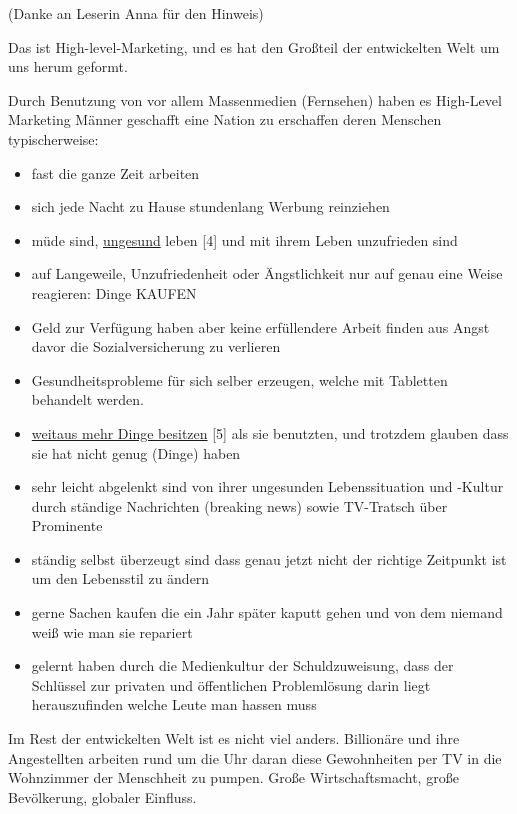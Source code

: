 (Danke an Leserin Anna für den Hinweis)

Das ist High-level-Marketing, und es hat den Großteil der entwickelten Welt um uns herum geformt.

Durch Benutzung von vor allem Massenmedien (Fernsehen) haben es High-Level Marketing Männer geschafft eine Nation zu erschaffen deren Menschen typischerweise:

\begin{itemize}
\item fast die ganze Zeit arbeiten
\item sich jede Nacht zu Hause stundenlang Werbung reinziehen
\item müde sind, \href{http://www.raptitude.com/2010/10/being-healthy-is-not-normal/}{ungesund} leben [4] und mit ihrem Leben unzufrieden sind
\item auf Langeweile, Unzufriedenheit oder Ängstlichkeit nur auf genau eine Weise reagieren: Dinge KAUFEN
\item Geld zur Verfügung haben aber keine erfüllendere Arbeit finden aus Angst davor die Sozialversicherung zu verlieren
\item Gesundheitsprobleme für sich selber erzeugen, welche mit Tabletten behandelt werden.
\item \href{http://www.raptitude.com/2011/01/i-dont-want-stuff-any-more-only-things/}{weitaus mehr Dinge besitzen} [5] als sie benutzten, und trotzdem glauben dass sie hat nicht genug (Dinge) haben
\item sehr leicht abgelenkt sind von ihrer ungesunden Lebenssituation und -Kultur durch ständige Nachrichten (breaking news) sowie TV-Tratsch über Prominente
\item ständig selbst überzeugt sind dass genau jetzt nicht der richtige Zeitpunkt ist um den Lebensstil zu ändern
\item gerne Sachen kaufen die ein Jahr später kaputt gehen und von dem niemand weiß wie man sie repariert
\item gelernt haben durch die Medienkultur der Schuldzuweisung, dass der Schlüssel zur privaten und öffentlichen Problemlösung darin liegt herauszufinden welche Leute man hassen muss
\end{itemize}

Im Rest der entwickelten Welt ist es nicht viel anders. Billionäre und ihre Angestellten arbeiten rund um die Uhr daran diese Gewohnheiten per TV in die Wohnzimmer der Menschheit zu pumpen. Große Wirtschaftsmacht, große Bevölkerung, globaler Einfluss.

